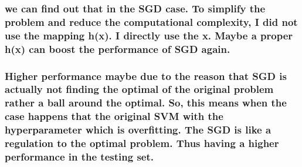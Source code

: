 \documentclass[11pt]{article}
\begin{document}
\hypertarget{we-can-find-out-that-in-the-sgd-case.-to-simplify-the-problem-and-reduce-the-computational-complexity-i-did-not-use-the-mapping-hx.-i-directly-use-the-x.-maybe-a-proper-hx-can-boost-the-performance-of-sgd-again.}{%
\subsubsection{we can find out that in the SGD case. To simplify the
problem and reduce the computational complexity, I did not use the
mapping h(x). I directly use the x. Maybe a proper h(x) can boost the
performance of SGD
again.}\label{we-can-find-out-that-in-the-sgd-case.-to-simplify-the-problem-and-reduce-the-computational-complexity-i-did-not-use-the-mapping-hx.-i-directly-use-the-x.-maybe-a-proper-hx-can-boost-the-performance-of-sgd-again.}}

\hypertarget{higher-performance-maybe-due-to-the-reason-that-sgd-is-actually-not-finding-the-optimal-of-the-original-problem-rather-a-ball-around-the-optimal.-so-this-means-when-the-case-happens-that-the-original-svm-with-the-hyperparameter-which-is-overfitting.-the-sgd-is-like-a-regulation-to-the-optimal-problem.-thus-having-a-higher-performance-in-the-testing-set.}{%
\subsubsection{Higher performance maybe due to the reason that SGD is
actually not finding the optimal of the original problem rather a ball
around the optimal. So, this means when the case happens that the
original SVM with the hyperparameter which is overfitting. The SGD is
like a regulation to the optimal problem. Thus having a higher
performance in the testing
set.}\label{higher-performance-maybe-due-to-the-reason-that-sgd-is-actually-not-finding-the-optimal-of-the-original-problem-rather-a-ball-around-the-optimal.-so-this-means-when-the-case-happens-that-the-original-svm-with-the-hyperparameter-which-is-overfitting.-the-sgd-is-like-a-regulation-to-the-optimal-problem.-thus-having-a-higher-performance-in-the-testing-set.}}


    
    
    
    
\end{document}
